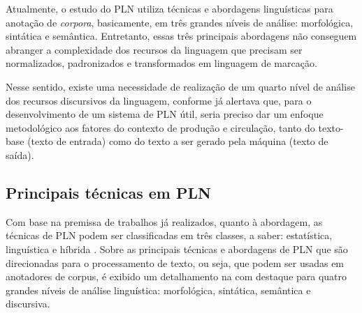 \documentclass[portuguese]{textolivre}
\begin{document}
Atualmente, o estudo do PLN utiliza técnicas e abordagens linguísticas para anotação de \textit{corpora}, basicamente, em três grandes níveis de análise: morfológica, sintática e semântica. Entretanto, essas três principais abordagens não conseguem abranger a complexidade dos recursos da linguagem que precisam ser normalizados, padronizados e transformados em linguagem de marcação.

Nesse sentido, existe uma necessidade de realização de um quarto nível de análise dos recursos discursivos da linguagem, conforme já alertava \cite{jones_probabilistic_2000} que, para o desenvolvimento de um sistema de PLN útil, seria preciso dar um enfoque metodológico aos fatores do contexto de produção e circulação, tanto do texto-base (texto de entrada) como do texto a ser gerado pela máquina (texto de saída).

\subsection{Principais técnicas em PLN}\label{sec-conduta}
Com base na premissa de trabalhos já realizados, quanto à abordagem, as técnicas de PLN podem ser classificadas em três classes, a saber: estatística, linguística e híbrida \cite{bharti_automatic_2017}. Sobre as principais técnicas e abordagens de PLN que são direcionadas para o processamento de texto, ou seja, que podem ser usadas em anotadores de corpus, é exibido um detalhamento na  com destaque para quatro grandes níveis de análise linguística: morfológica, sintática, semântica e discursiva.
\end{document}
